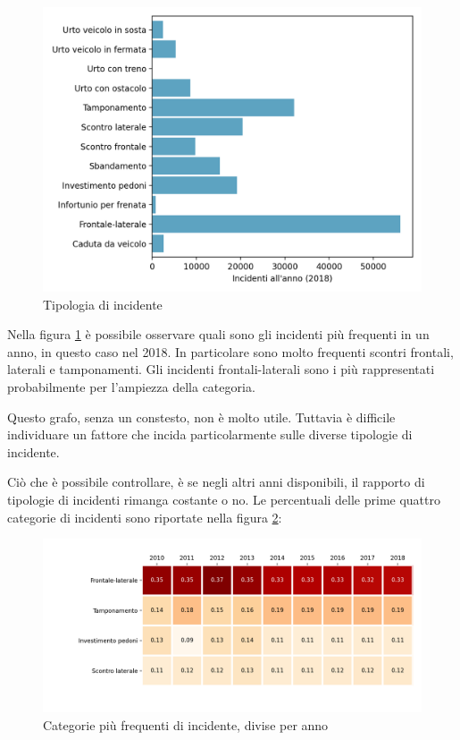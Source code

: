 \documentclass[a4paper]{report}
\begin{document}
\begin{figure}
    \includegraphics[width=\linewidth]{../src/incidenti/incidenti_senza_coords/localizzazione_incidente/tipo_incidente.png}
    \caption{Tipologia di incidente}
    \label{fig:tipo-incidente}
\end{figure}

Nella figura \ref{fig:tipo-incidente} è possibile osservare quali sono gli incidenti più frequenti 
in un anno, in questo caso nel 2018.
In particolare sono molto frequenti scontri frontali, laterali e tamponamenti. 
Gli incidenti frontali-laterali sono i più rappresentati probabilmente per l'ampiezza della 
categoria.

Questo grafo, senza un constesto, non è molto utile. Tuttavia è difficile individuare un fattore che 
incida particolarmente sulle diverse tipologie di incidente.

Ciò che è possibile controllare, è se negli altri anni disponibili, il rapporto di tipologie di 
incidenti rimanga costante o no.
Le percentuali delle prime quattro categorie di incidenti sono riportate nella figura 
\ref{fig:rapporto-tipologie}: 

\begin{figure}
    \includegraphics[width=\linewidth]{../src/incidenti/incidenti_senza_coords/localizzazione_incidente/rapporto_tipologie.png}
    \caption{Categorie più frequenti di incidente, divise per anno}
    \label{fig:rapporto-tipologie}
\end{figure}
\end{document}
